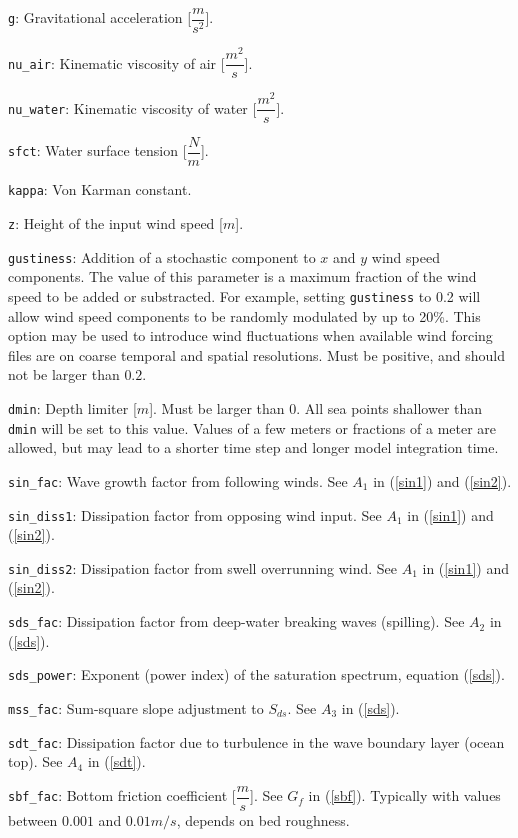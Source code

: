 \documentclass[letterpaper]{article}
\numberwithin{equation}{section}
\begin{document}
\verb+g+:
Gravitational acceleration [$\dfrac{m}{s^{2}}$].

\verb+nu_air+:
Kinematic viscosity of air [$\dfrac{m^{2}}{s}$].

\verb+nu_water+:
Kinematic viscosity of water [$\dfrac{m^{2}}{s}$].
  
\verb+sfct+:
Water surface tension [$\dfrac{N}{m}$].

\verb+kappa+:
Von Karman constant.

\verb+z+:
Height of the input wind speed [$m$].

\verb+gustiness+:
Addition of a stochastic component to $x$ and $y$ wind speed components.
The value of this parameter is a maximum fraction of the wind speed 
to be added or substracted.
For example, setting \verb+gustiness+ to 0.2 will allow wind speed components
to be randomly modulated by up to 20\%.
This option may be used to introduce wind fluctuations when available
wind forcing files are on coarse temporal and spatial resolutions.
Must be positive, and should not be larger than $0.2$.

\verb+dmin+:
Depth limiter [$m$]. Must be larger than $0$. 
All sea points shallower than \verb+dmin+ will be set to this value.
Values of a few meters or fractions of a meter are allowed, but may lead
to a shorter time step and longer model integration time.

\verb+sin_fac+:
Wave growth factor from following winds. 
See $A_{1}$ in (\ref{sin1}) and (\ref{sin2}).

\verb+sin_diss1+:
Dissipation factor from opposing wind input.
See $A_{1}$ in (\ref{sin1}) and (\ref{sin2}).

\verb+sin_diss2+:
Dissipation factor from swell overrunning wind.
See $A_{1}$ in (\ref{sin1}) and (\ref{sin2}).

\verb+sds_fac+:
Dissipation factor from deep-water breaking waves (spilling).
See $A_{2}$ in (\ref{sds}).

\verb+sds_power+:
Exponent (power index) of the saturation spectrum, equation (\ref{sds}).

\verb+mss_fac+:
Sum-square slope adjustment to $S_{ds}$.
See $A_{3}$ in (\ref{sds}).

\verb+sdt_fac+:
Dissipation factor due to turbulence in the wave boundary layer (ocean top).
See $A_{4}$ in (\ref{sdt}).

\verb+sbf_fac+:
Bottom friction coefficient [$\dfrac{m}{s}$].
See $G_{f}$ in (\ref{sbf}).
Typically with values between $0.001$ and $0.01 m/s$,
depends on bed roughness. 
\end{document}
